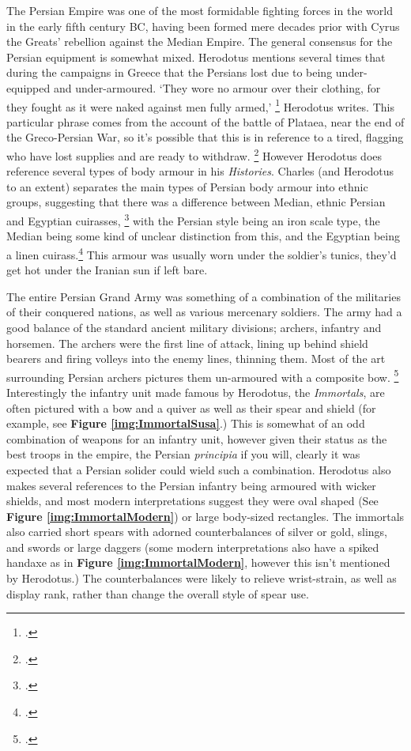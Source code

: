 \documentclass[twoside, a4paper, 12pt]{article}
\begin{document}
The Persian Empire was one of the most formidable fighting forces in the world
in the early fifth century BC, having been formed mere decades prior with
Cyrus the Greats' rebellion against the Median Empire.
The general consensus for the Persian equipment is somewhat mixed.
Herodotus mentions several times that during the campaigns in Greece that
the Persians lost due to being under-equipped and under-armoured.
`They wore no armour over their clothing, for they fought as it were
naked against men fully armed,' \footcite[Book 9.63.2]{herodotus_1920}
Herodotus writes. This particular phrase comes from the account of the battle
of Plataea, near the end of the Greco-Persian War, so it's possible that this
is in reference to a tired, flagging who have lost supplies and are ready
to withdraw. \footcite[267]{charles_bodyarmour_2012}
However Herodotus does reference several types of body armour in his \emph{Histories}.
Charles (and Herodotus to an extent) separates the main types of Persian body armour
into ethnic groups, suggesting that there was a difference between Median,
ethnic Persian and Egyptian cuirasses,
\footcite[Book 1.135]{herodotus_1920}
with the Persian style being an iron
scale type, the Median being some kind of unclear distinction from this, and
the Egyptian being a linen cuirass.\footcite[260-2]{charles_bodyarmour_2012}
This armour was usually worn under the soldier's tunics, they'd
get hot under the Iranian sun if left bare.

\par\vspace{1em}

The entire Persian Grand Army was something of a combination of the militaries
of their conquered nations, as well as various mercenary soldiers. The army had
a good balance of the standard ancient military divisions; archers, infantry
and horsemen. The archers were the first line of attack, lining up behind
shield bearers and firing volleys into the enemy lines, thinning them. Most
of the art surrounding Persian archers pictures them un-armoured with a composite
bow. \footcite{dhwty_2015}
Interestingly the infantry unit made famous by Herodotus, the \emph{Immortals},
are often pictured with a bow and a quiver as well as their spear and shield
(for example, see \textbf{Figure \ref{img:ImmortalSusa}}.)
This is somewhat of an odd combination of weapons for an infantry unit,
however given their status as the best troops in the empire, the Persian
\emph{principia} if you will, clearly it was expected that a Persian solider
could wield such a combination. Herodotus also makes several references to
the Persian infantry being armoured with wicker shields, and most modern
interpretations suggest they were oval shaped
(See \textbf{Figure \ref{img:ImmortalModern}}) or large body-sized rectangles.
The immortals also carried short spears with adorned counterbalances of silver
or gold, slings, and swords or large daggers (some modern interpretations also
have a spiked handaxe as in \textbf{Figure \ref{img:ImmortalModern}}, however
this isn't mentioned by Herodotus.) The counterbalances were likely to relieve
wrist-strain, as well as display rank, rather than change the overall style of
spear use.
\end{document}
